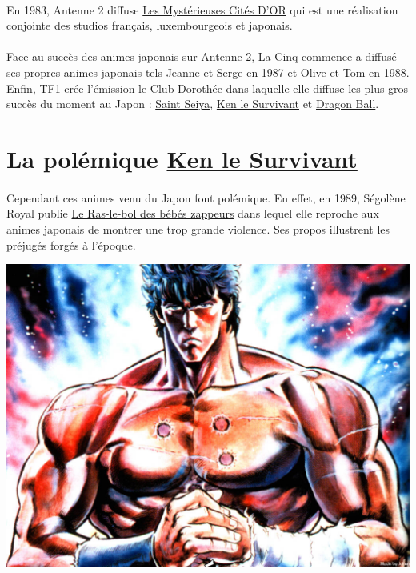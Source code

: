 \paragraph{} En 1983, Antenne 2 diffuse \underline{Les Mystérieuses Cités D'OR}
qui est une réalisation conjointe des studios français, luxembourgeois et
japonais.

\paragraph{} Face au succès des animes japonais sur Antenne 2, La Cinq commence
a diffusé ses propres animes japonais tels \underline{Jeanne et Serge} en 1987
et \underline{Olive et Tom} en 1988. Enfin, TF1 crée l'émission le Club
Dorothée dans laquelle elle diffuse les plus gros succès du moment au Japon :
\underline{Saint Seiya}, \underline{Ken le Survivant} et \underline{Dragon
Ball}.

\section{La polémique \underline{Ken le Survivant}}

\paragraph{} Cependant ces animes venu du Japon font polémique. En effet, en
1989, Ségolène Royal publie \underline{Le Ras-le-bol des bébés zappeurs} dans
lequel elle reproche aux animes japonais de montrer une trop grande violence.
Ses propos illustrent les préjugés forgés à l'époque.

\begin{center}
	\includegraphics[scale=0.15]{ken.jpg}
\end{center}


